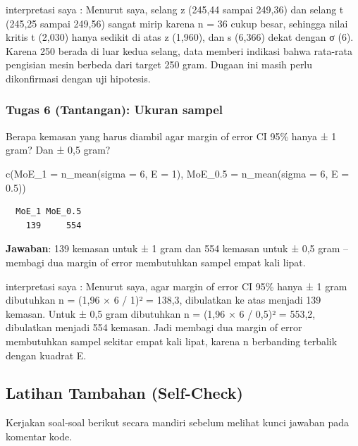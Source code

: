 \documentclass[
  indonesian,
  letterpaper,
]{book}
\newenvironment{Shaded}{\begin{snugshade}}{\end{snugshade}}
\newcommand{\AttributeTok}[1]{\textcolor[rgb]{0.40,0.45,0.13}{#1}}
\newcommand{\DecValTok}[1]{\textcolor[rgb]{0.68,0.00,0.00}{#1}}
\newcommand{\FloatTok}[1]{\textcolor[rgb]{0.68,0.00,0.00}{#1}}
\newcommand{\FunctionTok}[1]{\textcolor[rgb]{0.28,0.35,0.67}{#1}}
\newcommand{\NormalTok}[1]{\textcolor[rgb]{0.00,0.23,0.31}{#1}}
\begin{document}
interpretasi saya : Menurut saya, selang z (245,44 sampai 249,36) dan
selang t (245,25 sampai 249,56) sangat mirip karena n = 36 cukup besar,
sehingga nilai kritis t (2,030) hanya sedikit di atas z (1,960), dan s
(6,366) dekat dengan σ (6). Karena 250 berada di luar kedua selang, data
memberi indikasi bahwa rata-rata pengisian mesin berbeda dari target 250
gram. Dugaan ini masih perlu dikonfirmasi dengan uji hipotesis.

\subsubsection{Tugas 6 (Tantangan): Ukuran
sampel}\label{tugas-6-tantangan-ukuran-sampel}

Berapa kemasan yang harus diambil agar margin of error CI 95\% hanya ± 1
gram? Dan ± 0,5 gram?

\begin{Shaded}
\begin{Highlighting}[]
\FunctionTok{c}\NormalTok{(}\AttributeTok{MoE\_1 =} \FunctionTok{n\_mean}\NormalTok{(}\AttributeTok{sigma =} \DecValTok{6}\NormalTok{, }\AttributeTok{E =} \DecValTok{1}\NormalTok{), }\AttributeTok{MoE\_0.5 =} \FunctionTok{n\_mean}\NormalTok{(}\AttributeTok{sigma =} \DecValTok{6}\NormalTok{, }\AttributeTok{E =} \FloatTok{0.5}\NormalTok{))}
\end{Highlighting}
\end{Shaded}

\begin{verbatim}
  MoE_1 MoE_0.5 
    139     554 
\end{verbatim}

\textbf{Jawaban}: 139 kemasan untuk ± 1 gram dan 554 kemasan untuk ± 0,5
gram -- membagi dua margin of error membutuhkan sampel empat kali lipat.

interpretasi saya : Menurut saya, agar margin of error CI 95\% hanya ± 1
gram dibutuhkan n = (1,96 × 6 / 1)² = 138,3, dibulatkan ke atas menjadi
139 kemasan. Untuk ± 0,5 gram dibutuhkan n = (1,96 × 6 / 0,5)² = 553,2,
dibulatkan menjadi 554 kemasan. Jadi membagi dua margin of error
membutuhkan sampel sekitar empat kali lipat, karena n berbanding
terbalik dengan kuadrat E.

\subsection{Latihan Tambahan
(Self-Check)}\label{latihan-tambahan-self-check}

Kerjakan soal-soal berikut secara mandiri sebelum melihat kunci jawaban
pada komentar kode.
\end{document}
